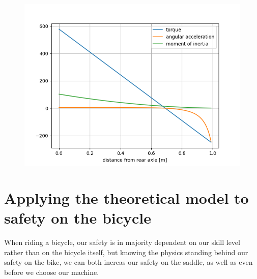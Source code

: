 \documentclass[12pt, a4]{article}
\begin{document}
\begin{figure}[H]
\caption{}
\centering%
\label{fig:angular_acceleration_graph}
\includegraphics[width=0.8\linewidth]{angular_acceleration}%
\end{figure}

\section{Applying the theoretical model to safety on the bicycle}
When riding a bicycle, our safety is in majority dependent on our skill level rather than on the bicycle itself, 
but knowing the physics standing behind our safety on the bike, we can both increas our safety on the saddle,
as well as even before we choose our machine.
\end{document}
